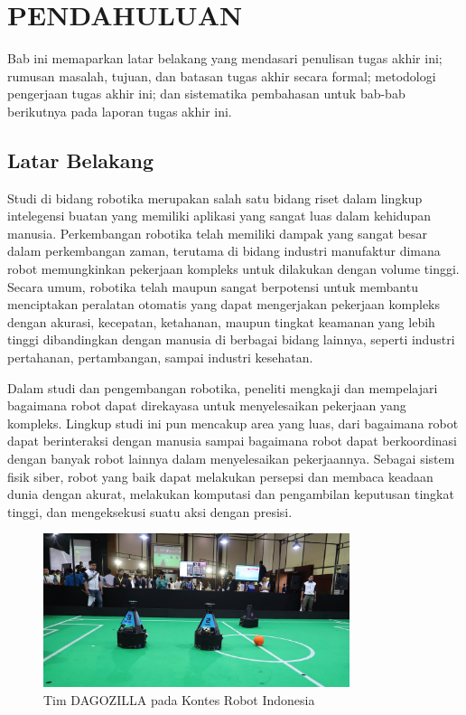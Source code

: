 \chapter{PENDAHULUAN}
\setcounter{page}{1}

Bab ini memaparkan latar belakang yang mendasari penulisan tugas akhir ini; rumusan masalah, tujuan, dan batasan tugas akhir secara formal; metodologi pengerjaan tugas akhir ini; dan sistematika pembahasan untuk bab-bab berikutnya pada laporan tugas akhir ini.

\section{Latar Belakang}

Studi di bidang robotika merupakan salah satu bidang riset dalam lingkup intelegensi buatan yang memiliki aplikasi yang sangat luas dalam kehidupan manusia. Perkembangan robotika telah memiliki dampak yang sangat besar dalam perkembangan zaman, terutama di bidang industri manufaktur dimana robot memungkinkan pekerjaan kompleks untuk dilakukan dengan volume tinggi. Secara umum, robotika telah maupun sangat berpotensi untuk membantu menciptakan peralatan otomatis yang dapat mengerjakan pekerjaan kompleks dengan akurasi, kecepatan, ketahanan, maupun tingkat keamanan yang lebih tinggi dibandingkan dengan manusia di berbagai bidang lainnya, seperti industri pertahanan, pertambangan, sampai industri kesehatan.

Dalam studi dan pengembangan robotika, peneliti mengkaji dan mempelajari bagaimana robot dapat direkayasa untuk menyelesaikan pekerjaan yang kompleks. Lingkup studi ini pun mencakup area yang luas, dari bagaimana robot dapat berinteraksi dengan manusia sampai bagaimana robot dapat berkoordinasi dengan banyak robot lainnya dalam menyelesaikan pekerjaannya. Sebagai sistem fisik siber, robot yang baik dapat melakukan persepsi dan membaca keadaan dunia dengan akurat, melakukan komputasi dan pengambilan keputusan tingkat tinggi, dan mengeksekusi suatu aksi dengan presisi.

\begin{figure}[h]
    \centering
    \medskip
    \includegraphics[width=0.8\textwidth]{resources/robotics-soccer.jpg}
    \caption{Tim DAGOZILLA pada Kontes Robot Indonesia}
    \label{fig:robotics-soccer}
    \bigskip
\end{figure}

